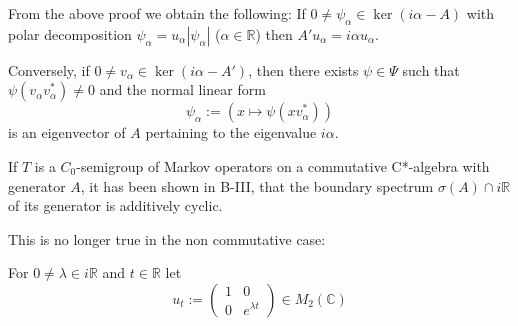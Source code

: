 \begin{remark}\label{rem:d3-1-9}
From the above proof we obtain the following: If $0 \neq \psi_{\alpha} \in \ker(i\alpha - A)$ with polar decomposition $\psi_{\alpha} = u_{\alpha}|\psi_{\alpha}|$ ($\alpha \in \mathbb{R}$) then $A'u_{\alpha} = i\alpha u_{\alpha}$.

Conversely, if $0 \neq v_{\alpha} \in \ker(i\alpha - A')$, then there exists $\psi \in \Psi$ such that $\psi(v_{\alpha}v_{\alpha}^{*}) \neq 0$ and the normal linear form
\[
\psi_{\alpha} := (x \mapsto \psi(xv_{\alpha}^{*}))
\]
is an eigenvector of $A$ pertaining to the eigenvalue $i\alpha$.
\end{remark}

If $T$ is a $C_{0}$-semigroup of Markov operators on a commutative C*-algebra with generator $A$, it has been shown in B-III, that the boundary spectrum $\sigma(A) \cap i\mathbb{R}$ of its generator is additively cyclic.

This is no longer true in the non commutative case:

For $0 \neq \lambda \in i\mathbb{R}$ and $t \in \mathbb{R}$ let
\[
u_{t} := \begin{pmatrix} 1 & 0 \\ 0 & e^{\lambda t} \end{pmatrix} \in M_{2}(\mathbb{C})
\]
